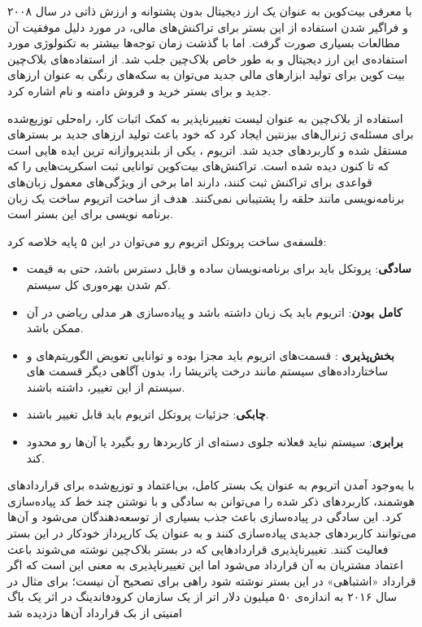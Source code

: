 \par
با معرفی بیت‌کوین 
به عنوان یک ارز دیجیتال بدون پشتوانه و ارزش ذاتی در سال ۲۰۰۸ 
\cite{bitcoin}
و فراگیر شدن استفاده از این بستر برای تراکنش‌های مالی، در مورد دلیل موفقیت آن مطالعات بسیاری صورت گرفت. اما با گذشت زمان توجه‌ها بیشتر به تکنولوژی مورد استفاده‌ی این ارز دیجیتال و به طور خاص بلاک‌چین
 جلب شد.
از استفاده‌های بلاک‌چین بیت کوین برای تولید ابزارهای مالی جدید می‌توان به سکه‌های رنگی به عنوان ارزهای جدید و
  برای بستر خرید و فروش دامنه‌ و نام اشاره کرد. 
\par
استفاده از بلاک‌چین به عنوان لیست تغییرناپذیر به کمک اثبات کار، راه‌حلی توزیع‌شده برای مسئله‌ی ژنرال‌های بیزنتین 
 ایجاد کرد که خود باعث تولید ارزهای جدید بر بسترهای مستقل شده و کاربردهای جدید شد. 
  اتریوم
\cite{Ethereum}،
یکی از بلندپروازانه ترین ایده هایی است که تا کنون دیده شده
 است. تراکنش‌های بیت‌کوین توانایی ثبت اسکرپت‌هایی را که قواعدی برای تراکنش ثبت کنند، دارند اما برخی از ویژگی‌های معمول زبان‌های برنامه‌نویسی
 مانند حلقه را پشتیبانی نمی‌کنند. هدف از ساخت اتریوم ساخت یک زبان برنامه نویسی
 برای این بستر است. 
\par
فلسفه‌ی ساخت پروتکل اتریوم رو می‌توان در این ۵ پایه خلاصه کرد: 
\begin{itemize}
	\item \textbf{سادگی}:
 پروتکل باید برای برنامه‌نویسان ساده و قابل دسترس باشد، حتی به قیمت کم شدن بهره‌وری کل سیستم.
\item  \textbf{کامل‌ بودن}:
اتریوم باید یک زبان
  داشته باشد و پیاده‌سازی هر مدلی ریاضی در آن ممکن باشد. 
\item \textbf{بخش‌پذیری} :
قسمت‌های اتریوم باید مجزا بوده و توانایی تعویض الگوریتم‌های و ساختارداده‌های سیستم مانند درخت پاتریشا را، بدون آگاهی دیگر قسمت های سیستم از این تغییر، داشته باشند.
\item \textbf{چابکی}:
 جزئیات پروتکل اتریوم باید قابل تغییر باشند. 
\item \textbf{برابری}:
سیستم نباید فعلانه جلوی دسته‌ای از کاربردها رو بگیرد یا آن‌ها رو محدود کند.
\end{itemize}
\par
با یه‌وجود آمدن اتریوم به عنوان یک بستر کامل، بی‌اعتماد و توزیع‌شده برای قرارداد‌های هوشمند، کاربرد‌های ذکر شده را می‌توانن به سادگی و با نوشتن چند خط کد پیاده‌سازی کرد. این سادگی در پیاده‌سازی باعث جذب بسیاری از توسعه‌دهندگان می‌شود و آن‌ها می‌توانند کاربردهای جدیدی پیاده‌‌سازی کنند و به عنوان یک کارپرداز خودکار در این بستر فعالیت کنند. تغییرناپذیری قرارداد‌هایی که در بستر بلاک‌چین نوشته می‌شوند باعث اعتماد مشتریان به آن قرارداد می‌شود اما این تغییرناپذیری به معنی این است که اگر قرارداد «اشتباهی» در این بستر نوشته شود راهی برای تصحیح آن نیست؛ برای مثال در سال ۲۰۱۶ به اندازه‌ی ۵۰ میلیون دلار اتر از یک سازمان کرودفاندینگ در اثر یک باگ امنیتی از بک قرارداد آن‌ها دزدیده شد
